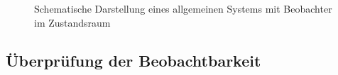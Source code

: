 \begin{figure}[H]
    \centering
    \caption[System mit Beobachter]{Schematische Darstellung eines allgemeinen Systems mit Beobachter im Zustandsraum}
    \label{fig:Bild44}
\end{figure}

\subsection{Überprüfung der Beobachtbarkeit}

